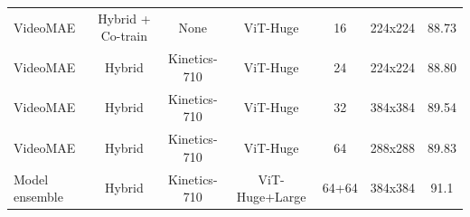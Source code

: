 \begin{table}[t]
\begin{tabular}{lcccccc}
     VideoMAE & Hybrid + Co-train & None & ViT-Huge & 16& 224x224 & 88.73 \\
     VideoMAE & Hybrid & Kinetics-710 & ViT-Huge & 24& 224x224 & 88.80 \\
     VideoMAE & Hybrid & Kinetics-710 & ViT-Huge & 32& 384x384 & 89.54 \\
     VideoMAE & Hybrid & Kinetics-710 & ViT-Huge & 64& 288x288 & 89.83 \\
     \midrule
     Model ensemble & Hybrid & Kinetics-710 & ViT-Huge+Large & 64+64 & 384x384 & 91.1 \\
    \bottomrule
  \end{tabular}
\label{tab:videomae-k400}
\end{table}